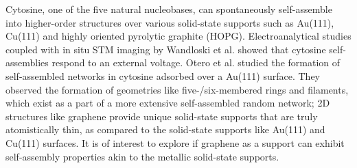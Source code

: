 Cytosine, one of the five natural nucleobases, can spontaneously self-assemble into higher-order structures over various solid-state supports such as Au(111),\supercite{kelly_understanding_2008, otero_elementary_2008} Cu(111)\supercite{tanaka_two-dimensional_1996} and highly oriented pyrolytic graphite (HOPG).\supercite{xu_directional_2021} Electroanalytical studies coupled with in situ STM imaging by Wandloski et al. showed that cytosine self-assemblies respond to an external voltage.\supercite{wandlowski_structure_1996} Otero et al. studied the formation of self-assembled networks in cytosine adsorbed over a Au(111) surface.\supercite{otero_elementary_2008} They observed the formation of geometries like five-/six-membered rings and filaments, which exist as a part of a more extensive self-assembled random network; 2D structures like graphene provide unique solid-state supports that are truly atomistically thin, as compared to the solid-state supports like Au(111) and Cu(111) surfaces. It is of interest to explore if graphene as a support can exhibit self-assembly properties akin to the metallic solid-state supports.

